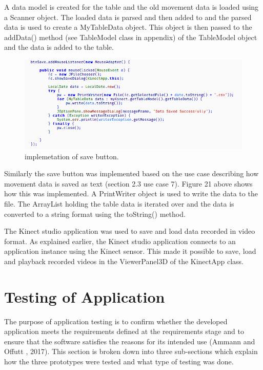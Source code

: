 \documentclass[a4paper, 12pt]{article}
\begin{document}
A data model is created for the table and the old movement data is loaded using a Scanner object. The loaded data is parsed and then added to and the parsed data is used to create a MyTableData object. This object is then passed to the addData() method (see TableModel class in appendix) of the TableModel object  and the data is added to the table.

 \begin{figure}[!htb]
	\begin{center}
  \includegraphics[scale=0.75]{codesnippet17.png}
  	\caption{implemetation of save button.}
  \end{center} 
  \label{fig: codesnippet16} 
\end{figure}

Similarly the save button was implemented based on the use case describing how movement data is saved as text (section 2.3 use case 7). Figure 21 above shows how this was implemented. A PrintWriter object is used to write the data to the file. The ArrayList holding the table data is iterated over and the data is converted to a string format using the toString() method.

The Kinect studio application was used to save and load data recorded in video format. As explained earlier, the Kinect studio application connects to an application instance using the Kinect sensor. This
made it possible to save, load and playback recorded videos in the ViewerPanel3D of the KinectApp class.   

\section{Testing of Application}

The purpose of application testing is to confirm whether the developed application meets the requirements defined at the requirements stage and to ensure that the software satisfies the reasons for its intended use (Ammann and Offutt , 2017). This section is broken down into three sub-sections which explain how the three prototypes were tested and what type of testing was done. 
\end{document}
